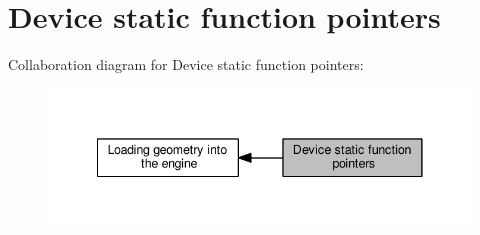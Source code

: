 \hypertarget{group__device__pointers}{}\section{Device static function pointers}
\label{group__device__pointers}
Collaboration diagram for Device static function pointers\+:\nopagebreak
\begin{figure}[H]
\begin{center}
\leavevmode
\includegraphics[width=341pt]{group__device__pointers}
\end{center}
\end{figure}
